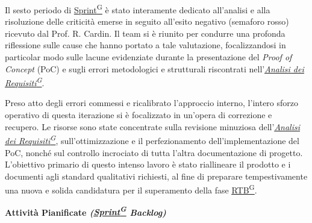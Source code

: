 \documentclass[a4paper,12pt]{article}
\providecommand{\glslink}[2]{\href{https://alittlebyte-19.github.io/Documentazione/glossario.html\#gls-#1}{\underline{#2}\textsuperscript{\scriptsize G}}}
\begin{document}
Il sesto periodo di \glslink{sprint}{Sprint} è stato interamente dedicato all'analisi e alla risoluzione delle criticità emerse in seguito all'esito negativo (semaforo rosso) ricevuto dal Prof. R. Cardin. Il team si è riunito per condurre una profonda riflessione sulle cause che hanno portato a tale valutazione, focalizzandosi in particolar modo sulle lacune evidenziate durante la presentazione del \textit{Proof of Concept} (PoC) e sugli errori metodologici e strutturali riscontrati nell'\textit{\glslink{analisi-dei-requisiti-adr}{Analisi dei Requisiti}}.

Preso atto degli errori commessi e ricalibrato l'approccio interno, l'intero sforzo operativo di questa iterazione si è focalizzato in un'opera di correzione e recupero. Le risorse sono state concentrate sulla revisione minuziosa dell'\textit{\glslink{analisi-dei-requisiti-adr}{Analisi dei Requisiti}}, sull'ottimizzazione e il perfezionamento dell'implementazione del PoC, nonché sul controllo incrociato di tutta l'altra documentazione di progetto. L'obiettivo primario di questo intenso lavoro è stato riallineare il prodotto e i documenti agli standard qualitativi richiesti, al fine di preparare tempestivamente una nuova e solida candidatura per il superamento della fase \glslink{rtb-requirements-and-technology-baseline}{RTB}.

\begin{center}
\noindent\textbf{Attività Pianificate \textit{(\glslink{sprint}{Sprint} Backlog)}}\\
\end{center}
\end{document}
